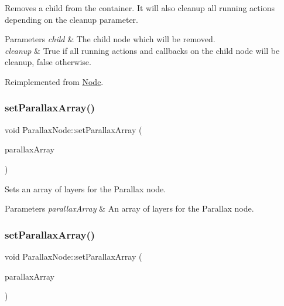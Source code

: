 Removes a child from the container. It will also cleanup all running actions depending on the cleanup parameter.


\begin{DoxyParams}{Parameters}
{\em child} & The child node which will be removed. \\
\hline
{\em cleanup} & True if all running actions and callbacks on the child node will be cleanup, false otherwise. \\
\hline
\end{DoxyParams}


Reimplemented from \hyperlink{classNode_a872d4a7d389b26b0c6ad7ed99c8b1b65}{Node}.

\mbox{\label{classParallaxNode_a6aa28ef360af7ce78e07ef0633da5396}} 
\subsubsection{\texorpdfstring{set\+Parallax\+Array()}{setParallaxArray()}\hspace{0.1cm}{\footnotesize\ttfamily [1/2]}}
{\footnotesize\ttfamily void Parallax\+Node\+::set\+Parallax\+Array (\begin{DoxyParamCaption}\item[{struct \+\_\+cc\+Array $\ast$}]{parallax\+Array }\end{DoxyParamCaption})\hspace{0.3cm}{\ttfamily [inline]}}

Sets an array of layers for the Parallax node.


\begin{DoxyParams}{Parameters}
{\em parallax\+Array} & An array of layers for the Parallax node. \\
\hline
\end{DoxyParams}
\mbox{\label{classParallaxNode_a6aa28ef360af7ce78e07ef0633da5396}} 
\subsubsection{\texorpdfstring{set\+Parallax\+Array()}{setParallaxArray()}\hspace{0.1cm}{\footnotesize\ttfamily [2/2]}}
{\footnotesize\ttfamily void Parallax\+Node\+::set\+Parallax\+Array (\begin{DoxyParamCaption}\item[{struct \+\_\+cc\+Array $\ast$}]{parallax\+Array }\end{DoxyParamCaption})\hspace{0.3cm}{\ttfamily [inline]}}

